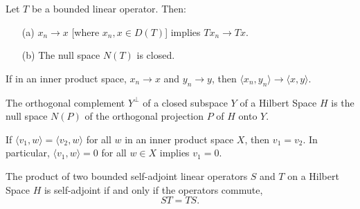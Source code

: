 \begin{corollary}\label{2.7-10}
    Let \( T  \) be a bounded linear operator. Then:
    \begin{enumerate}
        \item[(a)] \( {x}_{n} \to x  \) [where \( {x}_{n}, x \in D(T) \)] implies \( T {x}_{n} \to T x  \). 
        \item[(b)] The null space \( N(T) \) is closed.
    \end{enumerate}
\end{corollary}

\begin{lemma}\label{3.2-2}
   If in an inner product space, \( {x}_{n} \to x  \) and \( {y}_{n} \to y  \), then \( \langle {x}_{n}  ,  {y}_{n} \rangle \to \langle x , y \rangle \). 
\end{lemma}



\begin{lemma}\label{3.3-5}
    The orthogonal complement \( Y^{\perp} \) of a closed subspace \( Y  \) of a Hilbert Space \( H \) is the null space \( N(P) \) of the orthogonal projection \( P  \) of \( H  \) onto \( Y \).
\end{lemma}

\begin{lemma}[Equality (3.8-2)]\label{3.8-2}
   If \( \langle {v}_{1} , w  \rangle = \langle {v}_{2} , w  \rangle  \) for all \( w  \) in an inner product space \( X  \), then \( {v}_{1} = {v}_{2} \). In particular, \( \langle {v}_{1} , w  \rangle = 0  \) for all \( w \in X  \) implies \( {v}_{1} = 0  \). 
\end{lemma}

\begin{theorem}\label{3.10-4}
    The product of two bounded self-adjoint linear operators \( S  \) and \( T  \) on a Hilbert Space \( H \) is self-adjoint if and only if the operators commute, 
    \[  ST = TS. \]
\end{theorem}
